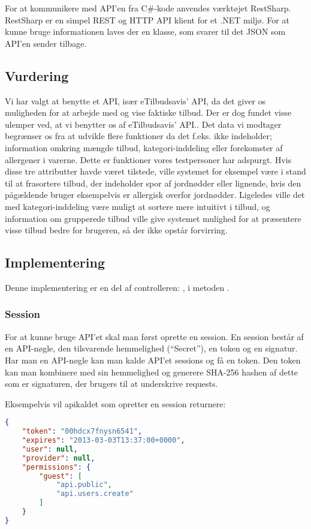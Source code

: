 For at kommunikere med API'en fra C\#-kode anvendes værktøjet RestSharp. RestSharp er en simpel REST og HTTP API klient for et .NET miljø. \citep{RestSharp}
For at kunne bruge informationen laves der en klasse, som svarer til det JSON som API'en sender tilbage.

\subsection{Vurdering}\label{api:skoddata}
Vi har valgt at benytte et API, især eTilbudsavis' API, da det giver os muligheden for at arbejde med og vise faktiske tilbud.
Der er dog fundet visse ulemper ved, at vi benytter os af eTilbudsavis' API.. 
Det data vi modtager begrænser os fra at udvikle flere funktioner da det f.eks. ikke indeholder; information omkring mængde tilbud, kategori-inddeling eller forekomster af allergener i varerne. 
Dette er funktioner vores testpersoner har adspurgt. 
Hvis disse tre attributter havde været tilstede, ville systemet for eksempel være i stand til at frasortere tilbud, der indeholder spor af jordnødder eller lignende, hvis den pågældende bruger eksempelvis er allergisk overfor jordnødder. 
Ligeledes ville det med kategori-inddeling være muligt at sortere mere intuitivt i tilbud, og information om grupperede tilbud ville give systemet mulighed for at præsentere visse tilbud bedre for brugeren, så der ikke opstår forvirring.

\subsection{Implementering}
Denne implementering er en del af controlleren: , i metoden .
\subsubsection{Session}
For at kunne bruge API'et skal man først oprette en session.
En session består af en API-nøgle, den tilsvarende hemmelighed (``Secret''), en token og en signatur.
Har man en API-nøgle kan man kalde API'et sessions og få en token.
Den token kan man kombinere med sin hemmelighed og generere SHA-256 hashen af dette som er signaturen, der brugers til at underskrive requests.

Eksempelvis vil apikaldet som opretter en session returnere:
\begin{lstlisting}[language=json,firstnumber=1,caption="POST til sessions api'en med APIKEYen",label=apilst1]
{
    "token": "00hdcx7fnysn6541",
    "expires": "2013-03-03T13:37:00+0000",
    "user": null,
    "provider": null,
    "permissions": {
        "guest": [
            "api.public",
            "api.users.create"
        ]
    }
}
\end{lstlisting}

